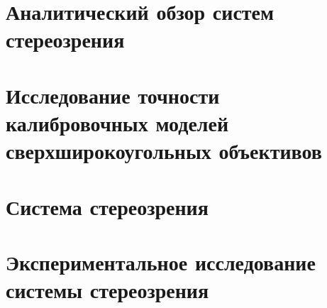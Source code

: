 \documentclass[a4paper,14pt]{extarticle} %
\begin{document}



\tableofcontents %
\clearpage


\section{Аналитический обзор систем стереозрения}


\newpage
\section{Исследование точности калибровочных моделей сверхширокоугольных объективов}




\newpage
\section{Система стереозрения}

\newpage
\section{Экспериментальное исследование системы стереозрения}

\newpage
{}

\newpage
{}
\printbibliography[heading=none] %


\newpage

\end{document}
